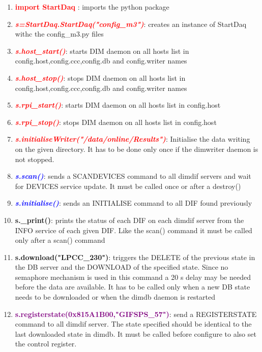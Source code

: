 \documentclass[english]{article}
\begin{document}
\begin{enumerate} 
\item \textcolor{red}{ \bf  import StartDaq} :  imports the python package

\item \textcolor{red}{\it \bf s=StartDaq.StartDaq("config\_m3")}:  creates an instance of StartDaq withc the config\_m3.py files

\item \textcolor{red}{\it \bf s.host\_start()}: starts DIM daemon on all hosts list in config.host,config.ccc,config.db and config.writer names 
\item \textcolor{red}{\it \bf s.host\_stop()}: stops DIM daemon on all hosts list in config.host,config.ccc,config.db and config.writer names
 \item \textcolor{red}{\it \bf s.rpi\_start()}: starts DIM daemon on all hosts list in config.host
\item \textcolor{red}{\it \bf s.rpi\_stop()}: stops DIM daemon on all hosts list in config.host

\item \textcolor{red}{\it \bf s.initialiseWriter("/data/online/Results")}: Initialise the data writing on the given directory. It has to be done only once if the dimwriter daemon is not stopped.

\item \textcolor{blue}{\it \bf s.scan()}: sends a SCANDEVICES command to all dimdif servers and wait for DEVICES service update. It must be called once or after a destroy()


\item \textcolor{blue}{\it {\bf s.initialise()}}: sends an INITIALISE command to all DIF found previously
\item {\bf s.\_print()}: prints the status of each DIF on each dimdif server from the INFO service of each given DIF. Like the scan() command it must be called only after a scan() command

\item {\bf s.download("LPCC\_230")}: triggers the DELETE of the previous state in the DB server and the DOWNLOAD of the specified state. Since no semaphore mechanism is used in this command a 20 s delay may be needed before the data are available. It has to be called only when a new DB state needs to be downloaded or when the dimdb daemon is restarted

\item \textcolor{purple}{\bf s.registerstate(0x815A1B00,"GIFSPS\_57")}: send a REGISTERSTATE command to all dimdif server. The state specified should be identical to the last downloaded state in dimdb. It must be called before configure to also set the control register.


\end{enumerate}
\end{document}
